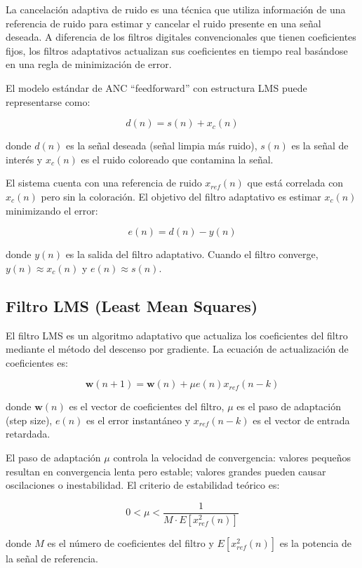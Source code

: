 \documentclass[12pt]{article}
\begin{document}
			La cancelación adaptiva de ruido es una técnica que utiliza información de una referencia de ruido para estimar y cancelar el ruido presente en una señal deseada. A diferencia de los filtros digitales convencionales que tienen coeficientes fijos, los filtros adaptativos actualizan sus coeficientes en tiempo real basándose en una regla de minimización de error.

			El modelo estándar de ANC ``feedforward'' con estructura LMS puede representarse como:

			\[
			d(n) = s(n) + x_c(n)
			\]

			donde $d(n)$ es la señal deseada (señal limpia más ruido), $s(n)$ es la señal de interés y $x_c(n)$ es el ruido coloreado que contamina la señal.

			El sistema cuenta con una referencia de ruido $x_{ref}(n)$ que está correlada con $x_c(n)$ pero sin la coloración. El objetivo del filtro adaptativo es estimar $x_c(n)$ minimizando el error:

			\[
			e(n) = d(n) - y(n)
			\]

			donde $y(n)$ es la salida del filtro adaptativo. Cuando el filtro converge, $y(n) \approx x_c(n)$ y $e(n) \approx s(n)$.

		\subsection{Filtro LMS (Least Mean Squares)}

			El filtro LMS es un algoritmo adaptativo que actualiza los coeficientes del filtro mediante el método del descenso por gradiente. La ecuación de actualización de coeficientes es:

			\[
			\mathbf{w}(n+1) = \mathbf{w}(n) + \mu e(n) x_{ref}(n-k)
			\]

			donde $\mathbf{w}(n)$ es el vector de coeficientes del filtro, $\mu$ es el paso de adaptación (step size), $e(n)$ es el error instantáneo y $x_{ref}(n-k)$ es el vector de entrada retardada.

			El paso de adaptación $\mu$ controla la velocidad de convergencia: valores pequeños resultan en convergencia lenta pero estable; valores grandes pueden causar oscilaciones o inestabilidad. El criterio de estabilidad teórico es:

			\[
			0 < \mu < \frac{1}{M \cdot E[x_{ref}^2(n)]}
			\]

			donde $M$ es el número de coeficientes del filtro y $E[x_{ref}^2(n)]$ es la potencia de la señal de referencia.
\end{document}
